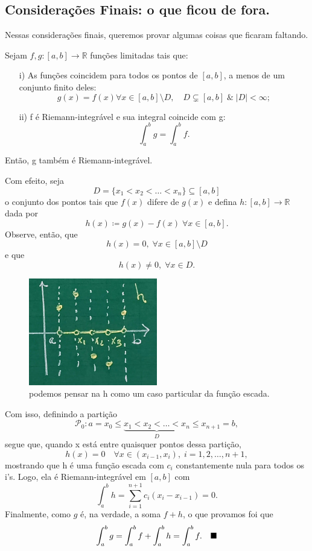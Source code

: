 \documentclass[../analysisII_notes.tex]{subfiles}
\begin{document}
\subsection{Considerações Finais: o que ficou de fora.}
Nessas considerações finais, queremos provar algumas coisas que ficaram faltando.
\begin{theorem*}
	Sejam \(f, g :[a, b]\rightarrow \mathbb{R}\) funções limitadas tais que:
	\begin{itemize}
		\item[i)]As funções coincidem para todos os pontos de \([a, b]\), a menos de um conjunto finito deles:
		      \[
			      g(x)=f(x) \forall x\in [a, b]\setminus{D},\quad D\subsetneq [a, b] \;\&\; |D|<\infty;
		      \]
		\item[ii)] f é Riemann-integrável e sua integral coincide com g:
		      \[
			      \int_{a}^{b}g = \int_{a}^{b} f.
		      \]
	\end{itemize}
	Então, g também é Riemann-integrável.
\end{theorem*}
\begin{proof*}
	Com efeito, seja
	\[
		D = \{x_{1}<x_{2}<\dotsc <x_{n}\}\subseteq [a, b]
	\]
	o conjunto dos pontos tais que \(f(x)\) difere de \(g(x)\) e defina \(h:[a, b]\rightarrow \mathbb{R}\) dada por
	\[
		h(x)\coloneqq g(x)-f(x) \; \forall x\in [a, b].
	\]
	Observe, então, que
	\[
		h(x) = 0,\; \forall x\in [a, b]\setminus{D}
	\]
	e que
	\[
		h(x)\neq 0,\; \forall x\in D.
	\]

	\begin{figure}[H]
		\begin{center}
			\includegraphics[height=0.5\textheight, width=0.5\textwidth, keepaspectratio]{./Images/stepfunc_09.png}
		\end{center}
		\caption{podemos pensar na h como um caso particular da função escada.}
		\label{stepfunc09}
	\end{figure}
	Com isso, definindo a partição
	\[
		\mathcal{P}_{0}: a = x_{0} \leq \underbrace{ x_1 < x_2 < \dotsc <x_{n}}_{D}\leq x_{n+1}=b,
	\]
	segue que, quando x está entre quaisquer pontos dessa partição,
	\[
		h(x) = 0 \quad \forall x\in (x_{i-1}, x_{i}),\; i = 1, 2, \dotsc , n+1,
	\]
	mostrando que h é uma função escada com \(c_{i}\) constantemente nula para todos os i's. Logo, ela é Riemann-integrável em \([a, b]\) com
	\[
		\int_{a}^{b}h = \sum\limits_{i=1}^{n+1}c_{i}(x_{i}-x_{i-1}) = 0.
	\]
	Finalmente, como \(g\) é, na verdade, a soma \(f + h\), o que provamos foi que
	\[
		\int_{a}^{b}g = \int_{a}^{b} f + \int_{a}^{b} h = \int_{a}^{b} f.\quad \text{$\blacksquare$}
	\]
\end{proof*}
\end{document}
